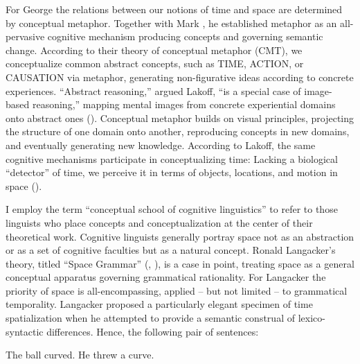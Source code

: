 \documentclass[output=paper]{langsci/langscibook}
\begin{document}
For George \citet{lakoff_contemporary_1993} the relations between our notions of time and space are determined by conceptual metaphor. Together with Mark \citet{johnson1980}, he established metaphor as an all\nobreakdash-pervasive cognitive mechanism producing concepts and governing semantic change. According to their theory of conceptual metaphor (CMT), we conceptualize common abstract concepts, such as TIME, ACTION, or CAUSATION via metaphor, generating non\nobreakdash-figurative ideas according to concrete experiences. “Abstract reasoning,” argued Lakoff, “is a special case of image\nobreakdash-based reasoning,” mapping mental images from concrete experiential domains onto abstract ones (\citealt[229]{lakoff_contemporary_1993}). Conceptual metaphor builds on visual principles, projecting the structure of one domain onto another, reproducing concepts in new domains, and eventually generating new knowledge. According to Lakoff, the same cognitive mechanisms participate in conceptualizing time: Lacking a biological “detector” of time, we perceive it in terms of objects, locations, and motion in space (\citealt[218]{lakoff_contemporary_1993}).

I employ the term “conceptual school of cognitive linguistics” to refer to those linguists who place concepts and conceptualization at the center of their theoretical work. Cognitive linguists generally portray space not as an abstraction or as a set of cognitive faculties but as a natural concept. Ronald Langacker’s theory, titled “Space Grammar” (\citeyear{langacker_space_1982}, \citeyear{langacker_foundations_1987}), is a case in point, treating space as a general conceptual apparatus governing grammatical rationality. For Langacker the priority of space is all\nobreakdash-encompassing, applied -- but not limited -- to grammatical temporality. Langacker proposed a particularly elegant specimen of time spatialization when he attempted to provide a semantic construal of lexico-syntactic differences. Hence, the following pair of sentences: 

\ea \label{ex:3:1} The ball curved.
\ex \label{ex:3:2} He threw a curve.
\z
         
\end{document}
